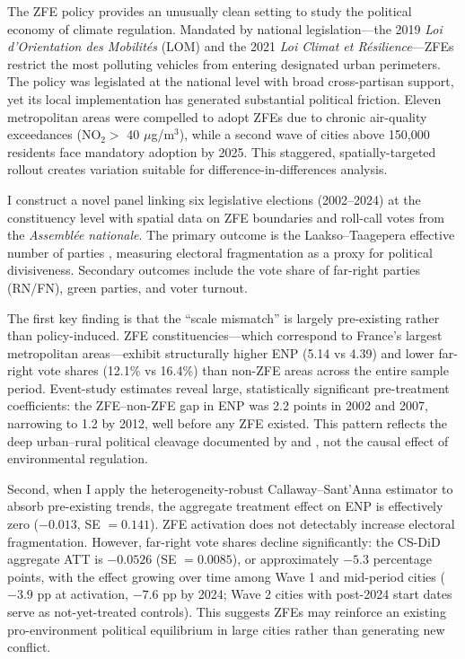 \documentclass[12pt]{article}
\begin{document}
The ZFE policy provides an unusually clean setting to study the political economy of climate regulation. Mandated by national legislation---the 2019 \textit{Loi d'Orientation des Mobilit\'es} (LOM) and the 2021 \textit{Loi Climat et R\'esilience}---ZFEs restrict the most polluting vehicles from entering designated urban perimeters. The policy was legislated at the national level with broad cross-partisan support, yet its local implementation has generated substantial political friction. Eleven metropolitan areas were compelled to adopt ZFEs due to chronic air-quality exceedances (NO$_2 >$ 40 $\mu$g/m$^3$), while a second wave of cities above 150,000 residents face mandatory adoption by 2025. This staggered, spatially-targeted rollout creates variation suitable for difference-in-differences analysis.

I construct a novel panel linking six legislative elections (2002--2024) at the constituency level with spatial data on ZFE boundaries and roll-call votes from the \textit{Assembl\'ee nationale}. The primary outcome is the Laakso--Taagepera effective number of parties \citep[ENP;][]{laakso1979effective}, measuring electoral fragmentation as a proxy for political divisiveness. Secondary outcomes include the vote share of far-right parties (RN/FN), green parties, and voter turnout.

The first key finding is that the ``scale mismatch'' is largely pre-existing rather than policy-induced. ZFE constituencies---which correspond to France's largest metropolitan areas---exhibit structurally higher ENP (5.14 vs 4.39) and lower far-right vote shares (12.1\% vs 16.4\%) than non-ZFE areas across the entire sample period. Event-study estimates reveal large, statistically significant pre-treatment coefficients: the ZFE--non-ZFE gap in ENP was 2.2 points in 2002 and 2007, narrowing to 1.2 by 2012, well before any ZFE existed. This pattern reflects the deep urban--rural political cleavage documented by \citet{piketty2018brahmin} and \citet{gethin2021cleavages}, not the causal effect of environmental regulation.

Second, when I apply the heterogeneity-robust Callaway--Sant'Anna estimator \citep{callaway2021difference} to absorb pre-existing trends, the aggregate treatment effect on ENP is effectively zero ($-0.013$, SE $= 0.141$). ZFE activation does not detectably increase electoral fragmentation. However, far-right vote shares decline significantly: the CS-DiD aggregate ATT is $-0.0526$ (SE $= 0.0085$), or approximately $-5.3$ percentage points, with the effect growing over time among Wave 1 and mid-period cities ($-3.9$ pp at activation, $-7.6$ pp by 2024; Wave 2 cities with post-2024 start dates serve as not-yet-treated controls). This suggests ZFEs may reinforce an existing pro-environment political equilibrium in large cities rather than generating new conflict.
\end{document}

